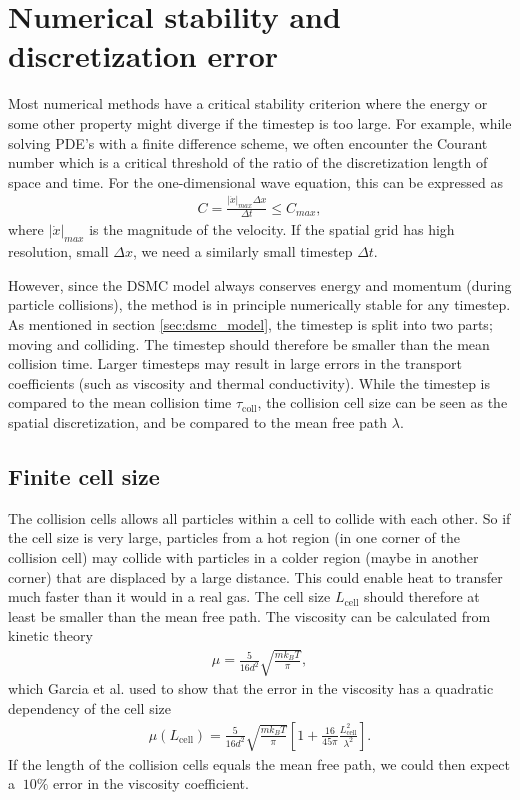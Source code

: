 \section{Numerical stability and discretization error}
\label{sec:dsmc_stability}
Most numerical methods have a critical stability criterion where the energy or some other property might diverge if the timestep is too large. For example, while solving PDE's with a finite difference scheme, we often encounter the Courant number which is a critical threshold of the ratio of the discretization length of space and time. For the one-dimensional wave equation, this can be expressed as
\begin{align}
	C = \frac{|\dot x|_{max} \Delta x}{\Delta t} \leq C_{max},
\end{align}
where $|\dot x|_{max}$ is the magnitude of the velocity. If the spatial grid has high resolution, small $\Delta x$, we need a similarly small timestep $\Delta t$.

However, since the DSMC model always conserves energy and momentum (during particle collisions), the method is in principle numerically stable for any timestep. As mentioned in section \ref{sec:dsmc_model}, the timestep is split into two parts; moving and colliding. The timestep should therefore be smaller than the mean collision time. Larger timesteps may result in large errors in the transport coefficients (such as viscosity and thermal conductivity)\cite{karniadakis2005microflows}. While the timestep is compared to the mean collision time $\tau_\text{coll}$, the collision cell size can be seen as the spatial discretization, and be compared to the mean free path $\lambda$. 
\subsection{Finite cell size}
The collision cells allows all particles within a cell to collide with each other. So if the cell size is very large, particles from a hot region (in one corner of the collision cell) may collide with particles in a colder region (maybe in another corner) that are displaced by a large distance. This could enable heat to transfer much faster than it would in a real gas. The cell size $L_\text{cell}$ should therefore at least be smaller than the mean free path\cite{karniadakis2005microflows}. The viscosity can be calculated from kinetic theory
\begin{align}
	\mu = \frac{5}{16d^2}\sqrt{\frac{mk_B T}{\pi}},
\end{align}
which Garcia et al. \cite{alexander1998cell} used to show that the error in the viscosity has a quadratic dependency of the cell size
\begin{align}
	\label{eq:viscosity_cell_size}
	\mu(L_\text{cell}) = \frac{5}{16d^2}\sqrt{\frac{mk_B T}{\pi}} \left [1 + \frac{16}{45\pi}\frac{L_\text{cell}^2}{\lambda^2}\right].
\end{align}
If the length of the collision cells equals the mean free path, we could then expect a $~10\%$ error in the viscosity coefficient.
